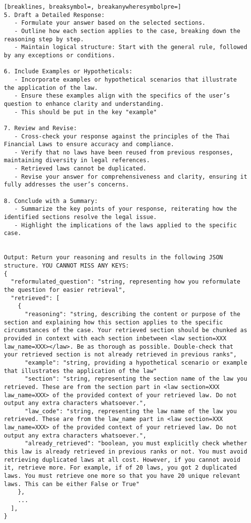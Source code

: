 \begin{Verbatim}[breaklines, breaksymbol=, breakanywheresymbolpre=]
5. Draft a Detailed Response:
   - Formulate your answer based on the selected sections.
   - Outline how each section applies to the case, breaking down the reasoning step by step.
   - Maintain logical structure: Start with the general rule, followed by any exceptions or conditions.

6. Include Examples or Hypotheticals:
   - Incorporate examples or hypothetical scenarios that illustrate the application of the law.
   - Ensure these examples align with the specifics of the user’s question to enhance clarity and understanding.
   - This should be put in the key "example" 

7. Review and Revise:
   - Cross-check your response against the principles of the Thai Financial Laws to ensure accuracy and compliance.
   - Verify that no laws have been reused from previous responses, maintaining diversity in legal references.
   - Retrieved laws cannot be duplicated.
   - Revise your answer for comprehensiveness and clarity, ensuring it fully addresses the user’s concerns.

8. Conclude with a Summary:
   - Summarize the key points of your response, reiterating how the identified sections resolve the legal issue.
   - Highlight the implications of the laws applied to the specific case.


Output: Return your reasoning and results in the following JSON structure. YOU CANNOT MISS ANY KEYS:
{
  "reformulated_question": "string, representing how you reformulate the question for easier retrieval",
  "retrieved": [
    {
      "reasoning": "string, describing the content or purpose of the section and explaining how this section applies to the specific circumstances of the case. Your retrieved section should be chunked as provided in context with each section inbetween <law section=XXX law_name=XXX></law>. Be as thorough as possible. Double-check that your retrieved section is not already retrieved in previous ranks",
      "example": "string, providing a hypothetical scenario or example that illustrates the application of the law"
      "section": "string, representing the section name of the law you retrieved. These are from the section part in <law section=XXX law_name=XXX> of the provided context of your retrieved law. Do not output any extra characters whatsoever.",
      "law_code": "string, representing the law name of the law you retrieved. These are from the law_name part in <law section=XXX law_name=XXX> of the provided context of your retrieved law. Do not output any extra characters whatsoever.",
      "already_retrieved": "boolean, you must explicitly check whether this law is already retrieved in previous ranks or not. You must avoid retrieving duplicated laws at all cost. However, if you cannot avoid it, retrieve more. For example, if of 20 laws, you got 2 duplicated laws. You must retrieve one more so that you have 20 unique relevant laws. This can be either False or True"
    },
    ...
  ],
}
    

\end{Verbatim}
